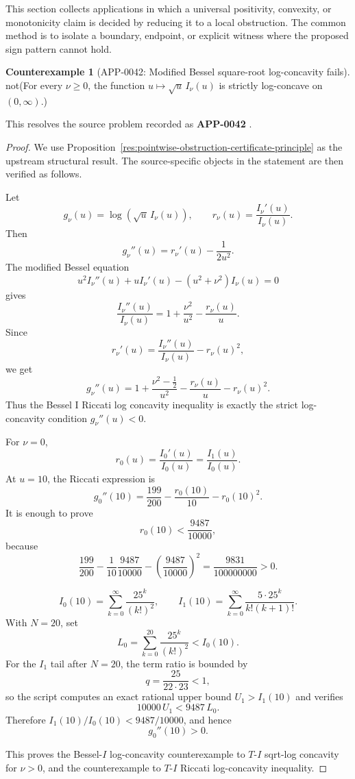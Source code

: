 \documentclass[11pt]{article}
\numberwithin{equation}{section}
\theoremstyle{definition}
\newtheorem{counterexample}[theorem]{Counterexample}
\theoremstyle{remark}
\newcommand{\1}{\mathbf 1}
\begin{document}
This section collects applications in which a universal positivity, convexity, or monotonicity claim is decided by reducing it to a local obstruction.  The common method is to isolate a boundary, endpoint, or explicit witness where the proposed sign pattern cannot hold.

\begin{counterexample}[APP-0042: Modified Bessel square-root log-concavity fails]
\label{res:not-bessel-i-sqrt-log-concavity-nu-ge-0-app-0042}
not(For every \(\nu\ge0\), the function \(u\mapsto \sqrt{u}\,I_\nu(u)\) is strictly log-concave on \((0,\infty)\).)



This resolves the source problem recorded as \textbf{APP-0042} \cite{app-app-0042-source}.
\end{counterexample}

\begin{proof}
We use Proposition~\ref{res:pointwise-obstruction-certificate-principle} as the upstream structural result. The source-specific objects in the statement are then verified as follows.

Let
\[
g_\nu(u)=\log(\sqrt u\,I_\nu(u)),
\qquad
r_\nu(u)=\frac{I_\nu'(u)}{I_\nu(u)}.
\]
Then
\[
g_\nu''(u)=r_\nu'(u)-\frac{1}{2u^2}.
\]
The modified Bessel equation
\[
u^2I_\nu''(u)+uI_\nu'(u)-(u^2+\nu^2)I_\nu(u)=0
\]
gives
\[
\frac{I_\nu''(u)}{I_\nu(u)}
=1+\frac{\nu^2}{u^2}-\frac{r_\nu(u)}{u}.
\]
Since
\[
r_\nu'(u)=\frac{I_\nu''(u)}{I_\nu(u)}-r_\nu(u)^2,
\]
we get
\[
g_\nu''(u)
=
1+\frac{\nu^2-\frac12}{u^2}
-\frac{r_\nu(u)}{u}
-r_\nu(u)^2.
\]
Thus the Bessel I Riccati log concavity inequality is exactly the strict log-concavity condition \(g_\nu''(u)<0\).

For \(\nu=0\),
\[
r_0(u)=\frac{I_0'(u)}{I_0(u)}=\frac{I_1(u)}{I_0(u)}.
\]
At \(u=10\), the Riccati expression is
\[
g_0''(10)=\frac{199}{200}-\frac{r_0(10)}{10}-r_0(10)^2.
\]
It is enough to prove
\[
r_0(10)<\frac{9487}{10000},
\]
because
\[
\frac{199}{200}
-\frac{1}{10}\frac{9487}{10000}
-\left(\frac{9487}{10000}\right)^2
=\frac{9831}{100000000}>0.
\]

\[
I_0(10)=\sum_{k=0}^{\infty}\frac{25^k}{(k!)^2},
\qquad
I_1(10)=\sum_{k=0}^{\infty}\frac{5\cdot25^k}{k!(k+1)!}.
\]
With \(N=20\), set
\[
L_0=\sum_{k=0}^{20}\frac{25^k}{(k!)^2}<I_0(10).
\]
For the \(I_1\) tail after \(N=20\), the term ratio is bounded by
\[
q=\frac{25}{22\cdot23}<1,
\]
so the script computes an exact rational upper bound \(U_1>I_1(10)\) and verifies
\[
10000\,U_1<9487\,L_0.
\]
Therefore \(I_1(10)/I_0(10)<9487/10000\), and hence
\[
g_0''(10)>0.
\]

This proves the Bessel-\(I\) log-concavity counterexample to \(T\)-\(I\) sqrt-log concavity for \(\nu>0\), and the counterexample to \(T\)-\(I\) Riccati log-concavity inequality.
\end{proof}
\end{document}

